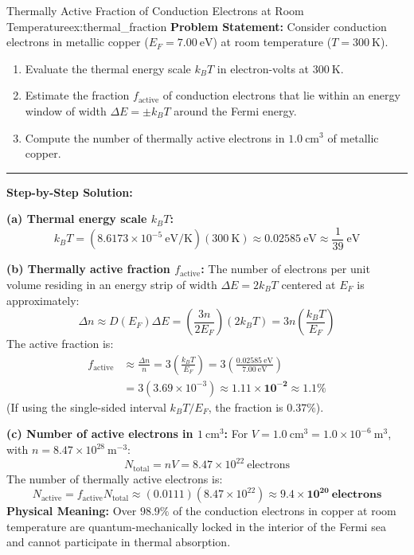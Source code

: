 \documentclass[11pt,a4paper]{article}
\begin{document}
\begin{examplebox}{Thermally Active Fraction of Conduction Electrons at Room Temperature}{ex:thermal_fraction}
\textbf{Problem Statement:}
Consider conduction electrons in metallic copper ($E_F = 7.00\ \mathrm{eV}$) at room temperature ($T = 300\ \mathrm{K}$).
\begin{enumerate}[label=(\alph*)]
    \item Evaluate the thermal energy scale $k_B T$ in electron-volts at $300\ \mathrm{K}$.
    \item Estimate the fraction $f_{\mathrm{active}}$ of conduction electrons that lie within an energy window of width $\Delta E = \pm k_B T$ around the Fermi energy.
    \item Compute the number of thermally active electrons in $1.0\ \mathrm{cm}^3$ of metallic copper.
\end{enumerate}

\vspace{0.2cm}\hrule\vspace{0.2cm}
\textbf{Step-by-Step Solution:}

\textbf{(a) Thermal energy scale $k_B T$:}
\[
k_B T = (8.6173 \times 10^{-5}\ \mathrm{eV/K})(300\ \mathrm{K}) \approx \mathbf{0.02585\ \mathrm{eV}} \approx \frac{1}{39}\ \mathrm{eV}
\]

\textbf{(b) Thermally active fraction $f_{\mathrm{active}}$:}
The number of electrons per unit volume residing in an energy strip of width $\Delta E = 2 k_B T$ centered at $E_F$ is approximately:
\[
\Delta n \approx D(E_F) \Delta E = \left(\frac{3n}{2E_F}\right)(2 k_B T) = 3n\left(\frac{k_B T}{E_F}\right)
\]
The active fraction is:
\begin{align*}
f_{\mathrm{active}} &\approx \frac{\Delta n}{n} = 3\left(\frac{k_B T}{E_F}\right) = 3\left(\frac{0.02585\ \mathrm{eV}}{7.00\ \mathrm{eV}}\right) \\
&= 3(3.69 \times 10^{-3}) \approx \mathbf{1.11 \times 10^{-2}} \approx \mathbf{1.1\%}
\end{align*}
(If using the single-sided interval $k_B T/E_F$, the fraction is $0.37\%$).

\textbf{(c) Number of active electrons in $1\ \mathrm{cm}^3$:}
For $V = 1.0\ \mathrm{cm}^3 = 1.0 \times 10^{-6}\ \mathrm{m}^3$, with $n = 8.47 \times 10^{28}\ \mathrm{m}^{-3}$:
\[
N_{\mathrm{total}} = n V = 8.47 \times 10^{22}\ \text{electrons}
\]
The number of thermally active electrons is:
\[
N_{\mathrm{active}} = f_{\mathrm{active}} N_{\mathrm{total}} \approx (0.0111)(8.47 \times 10^{22}) \approx \mathbf{9.4 \times 10^{20}\ \text{electrons}}
\]
\textbf{Physical Meaning:} Over $98.9\%$ of the conduction electrons in copper at room temperature are quantum-mechanically locked in the interior of the Fermi sea and cannot participate in thermal absorption.
\end{examplebox}
\end{document}
